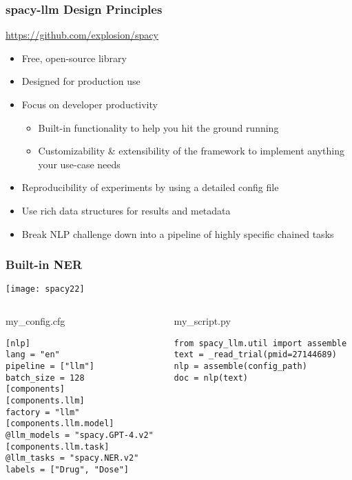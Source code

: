 \begin{frame}[fragile]\frametitle{spacy-llm Design Principles}

\url{https://github.com/explosion/spacy}

\begin{itemize}
\item Free, open-source library
\item Designed for production use
\item Focus on developer productivity
\begin{itemize}
\item Built-in functionality to help you hit the ground running
\item Customizability \& extensibility of the framework to implement anything your use-case needs
\end{itemize}
\item Reproducibility of experiments by using a detailed config file
\item Use rich data structures for results and metadata
\item Break NLP challenge down into a pipeline of highly specific chained tasks
\end{itemize}

\end{frame}


\begin{frame}[fragile]\frametitle{Built-in NER}

\begin{center}
\texttt{[image: spacy22]}
\end{center}

\begin{columns}
    \begin{column}[T]{0.6\linewidth}
my\_conﬁg.cfg
	\begin{lstlisting}
[nlp]
lang = "en"
pipeline = ["llm"]
batch_size = 128
[components]
[components.llm]
factory = "llm"
[components.llm.model]
@llm_models = "spacy.GPT-4.v2"
[components.llm.task]
@llm_tasks = "spacy.NER.v2"
labels = ["Drug", "Dose"]
	\end{lstlisting}
    \end{column}
    \begin{column}[T]{0.4\linewidth}



my\_script.py
	\begin{lstlisting}
from spacy_llm.util import assemble
text = _read_trial(pmid=27144689)
nlp = assemble(config_path)
doc = nlp(text)
	\end{lstlisting}
\end{column}
\end{columns}




\end{frame}


